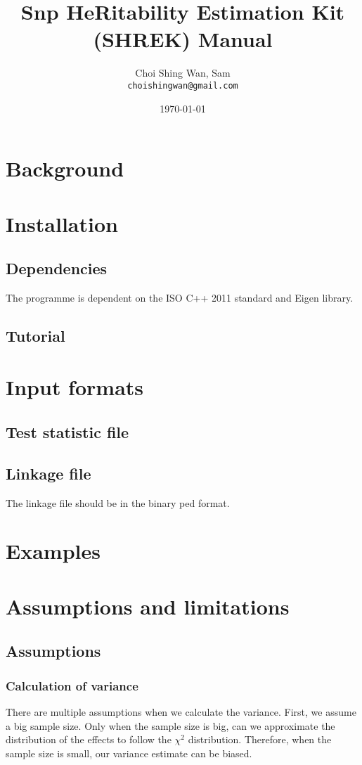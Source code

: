 \documentclass[12pt,a4paper,twoside]{report}
\title{Snp HeRitability Estimation Kit (SHREK) Manual}
\date{\today}
\author{Choi Shing Wan, Sam\\
\texttt{choishingwan@gmail.com}}
\begin{document}
\maketitle
\tableofcontents
\chapter{Background}
\chapter{Installation}
\section{Dependencies}
The programme is dependent on the ISO C++ 2011 standard and Eigen library.
\section{Tutorial}
\chapter{Input formats}
\section{Test statistic file}
\section{Linkage file}
The linkage file should be in the binary ped format. 
\chapter{Examples}
\chapter{Assumptions and limitations}
\section{Assumptions}
\subsection{Calculation of variance}
There are multiple assumptions when we calculate the variance. 
First, we assume a big sample size. Only when the sample size is big, can we approximate the distribution of the effects to follow the $\chi^2$ distribution. 
Therefore, when the sample size is small, our variance estimate can be biased.
\end{document}
